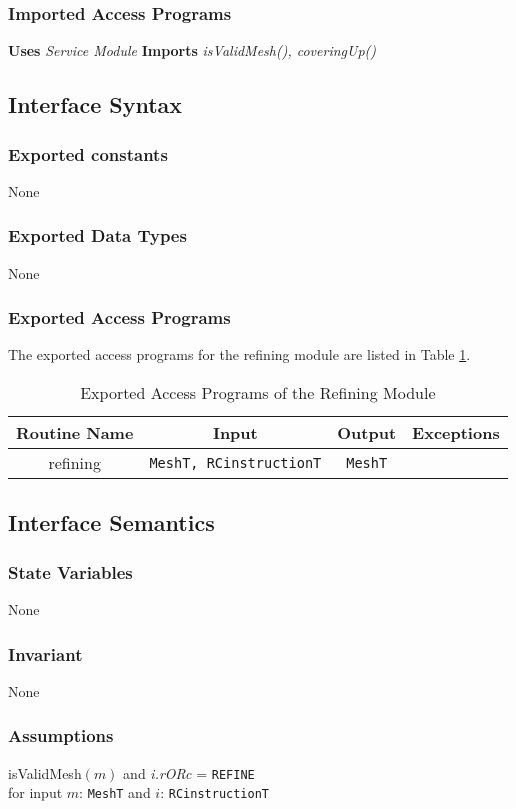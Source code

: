 \documentclass[12pt,titlepage]{article}
\begin{document}
\subsubsection{Imported Access Programs}
{\bf Uses}  \emph{Service Module}  {\bf Imports}  \emph{isValidMesh(), coveringUp()}  

\subsection{Interface Syntax}
\subsubsection{Exported constants} None
\subsubsection{Exported Data Types} None
\subsubsection{Exported Access Programs}
The exported access programs for the refining module are listed in Table \ref{AmisRefEAP}.
\begin{table}[htbp]
\centering
\begin{tabular}{|c|c|c|c|}
\hline
Routine Name & Input & Output & Exceptions \\ 
\hline
refining & {\tt MeshT, RCinstructionT} &{\tt MeshT} & \\
\hline
\end{tabular}
\caption{Exported Access Programs of the Refining Module}
\label{AmisRefEAP} 
\end{table}

\subsection{Interface Semantics}
\subsubsection{State Variables}None
\subsubsection{Invariant} None
\subsubsection{Assumptions} isValidMesh$(m)$ and {\it i.rORc} = {\tt REFINE} \\for input $m$: {\tt MeshT} and $i$: {\tt RCinstructionT}
\end{document}
